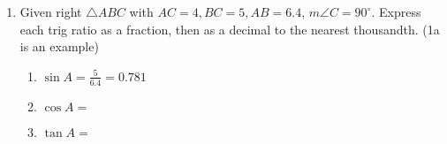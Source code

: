 \begin{enumerate}
\item Given right $\triangle ABC$ with $AC=4, BC=5, AB=6.4$, $m\angle C=90^\circ$. Express each trig ratio as a fraction, then as a decimal to the nearest thousandth. (1a is an example)
\begin{center}
\end{center}
  \begin{enumerate}
    \item $\displaystyle \sin A = \frac{5}{6.4} = 0.781$ \vspace{1cm}
    \item $\cos A =$ \vspace{1cm}
    \item $\tan A =$
  \end{enumerate}


\end{enumerate}
